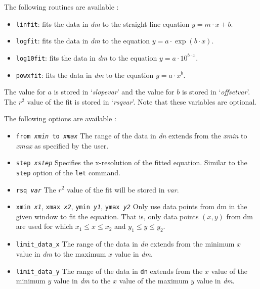 \begin{commanddescription}
The following routines are available :
\begin{itemize}
\item \texttt{linfit}: fits the data in \textit{dm} to the straight line equation $y = m \cdot x + b$.
\item \texttt{logfit}: fits the data in \textit{dm} to the equation $y = a \cdot \exp(b \cdot x)$.
\item \texttt{log10fit}: fits the data in \textit{dm} to the equation $y = a \cdot 10^{b \cdot x}$.
\item \texttt{powxfit}: fits the data in \textit{dm} to the equation $y = a \cdot x^b$.
\end{itemize}

The value for $a$ is stored in `{\it slopevar}' and the value for $b$ is stored in `{\it offsetvar}'. The $r^2$ value of the fit is stored in `{\it rsqvar}'. Note that these variables are optional.

The following options are available :
\begin{itemize}
\item \texttt{from {\it xmin} to {\it xmax}} The range of the data in \textit{dn} extends from the \textit{xmin} to \textit{xmax} as specified by the user.

\item \texttt{step {\it xstep}} Specifies the x-resolution of the fitted equation. Similar to the \texttt{step} option of the \texttt{let} command.

\item \texttt{rsq {\it var}} The $r^2$ value of the fit will be stored in {\it var}.

\item \texttt{xmin {\it x1}}, \texttt{xmax {\it x2}}, \texttt{ymin {\it y1}}, \texttt{ymax {\it y2}} Only use data points from dm in the given window to fit the equation. That is, only data points $(x,y)$ from dm are used for which $x_1 \le x \le x_2$ and $y_1 \le y \le y_2$.

\item \texttt{limit\_data\_x} The range of the data in \textit{dn} extends from the minimum $x$ value in \textit{dm} to the maximum $x$ value in \textit{dm}.

\item \texttt{limit\_data\_y} The range of the data in \texttt{dn} extends from the $x$ value of the minimum $y$ value in \textit{dm} to the $x$ value of the maximum $y$ value in \textit{dm}.


\end{itemize}
\end{commanddescription}
